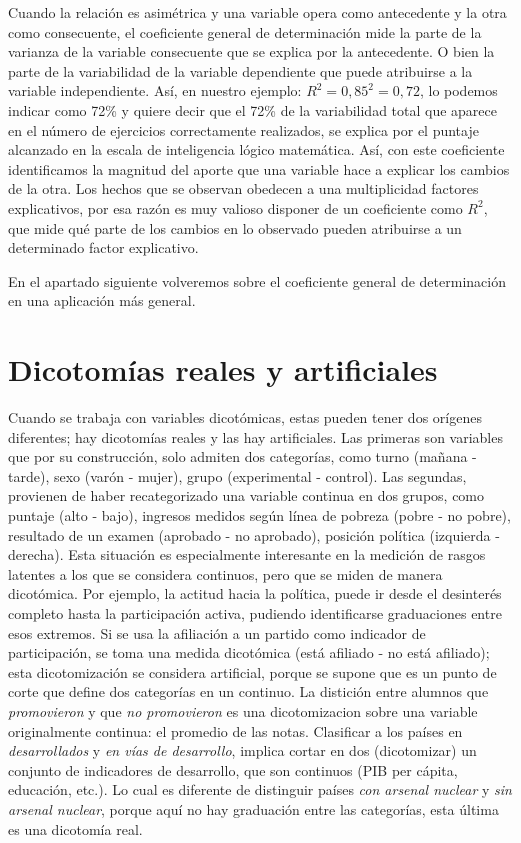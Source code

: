 \documentclass[]{book}
\begin{document}
Cuando la relación es asimétrica y una variable opera como antecedente y
la otra como consecuente, el coeficiente general de determinación mide
la parte de la varianza de la variable consecuente que se explica por la
antecedente. O bien la parte de la variabilidad de la variable
dependiente que puede atribuirse a la variable independiente. Así, en
nuestro ejemplo: \(R^{2} = {0,85}^{2} = 0,72\), lo podemos indicar como
72\% y quiere decir que el 72\% de la variabilidad total que aparece en el
número de ejercicios correctamente realizados, se explica por el puntaje
alcanzado en la escala de inteligencia lógico matemática. Así, con este
coeficiente identificamos la magnitud del aporte que una variable hace a
explicar los cambios de la otra. Los hechos que se observan obedecen a
una multiplicidad factores explicativos, por esa razón es muy valioso
disponer de un coeficiente como \(R^{2}\), que mide qué parte de los
cambios en lo observado pueden atribuirse a un determinado factor
explicativo.

En el apartado siguiente volveremos sobre el coeficiente general de
determinación en una aplicación más general.

\hypertarget{dicotomias-reales-y-artificiales}{%
\section{Dicotomías reales y artificiales}\label{dicotomias-reales-y-artificiales}}

Cuando se trabaja con variables dicotómicas, estas pueden tener dos
orígenes diferentes; hay dicotomías reales y las hay artificiales. Las primeras son variables que por su construcción, solo admiten dos
categorías, como turno (mañana - tarde), sexo (varón - mujer), grupo
(experimental - control). Las segundas, provienen de haber
recategorizado una variable continua en dos grupos, como puntaje (alto - bajo), ingresos medidos según línea de pobreza (pobre - no pobre), resultado de un examen (aprobado - no aprobado), posición política (izquierda - derecha). Esta situación es especialmente interesante en la medición de rasgos latentes a los que se considera continuos, pero que se miden de manera dicotómica. Por ejemplo, la actitud hacia la política, puede ir desde el desinterés completo hasta la participación activa, pudiendo identificarse graduaciones entre esos extremos. Si se usa la afiliación a un partido como indicador de participación, se toma una medida dicotómica (está afiliado - no está afiliado); esta dicotomización se considera artificial, porque se supone que es un punto de corte que define dos categorías en un continuo. La distición entre alumnos que \emph{promovieron} y que \emph{no promovieron} es una dicotomizacion sobre una variable originalmente continua: el promedio de las notas. Clasificar a los países en \emph{desarrollados} y \emph{en vías de desarrollo}, implica cortar en dos (dicotomizar) un conjunto de indicadores de desarrollo, que son continuos (PIB per cápita, educación, etc.). Lo cual es diferente de distinguir países \emph{con arsenal nuclear} y \emph{sin arsenal nuclear}, porque aquí no hay graduación entre las categorías, esta última es una dicotomía real.
\end{document}
